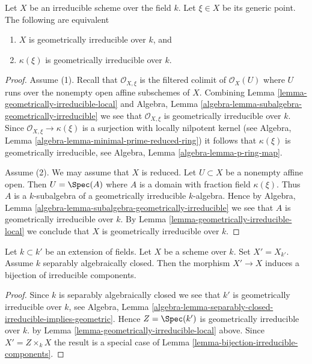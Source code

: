\begin{lemma}
\label{lemma-geometrically-irreducible-function-field}
Let $X$ be an irreducible scheme over the field $k$. Let $\xi \in X$
be its generic point. The following are equivalent
\begin{enumerate}
\item $X$ is geometrically irreducible over $k$, and
\item $\kappa(\xi)$ is geometrically irreducible over $k$.
\end{enumerate}
\end{lemma}

\begin{proof}
Assume (1). Recall that $\mathcal{O}_{X, \xi}$ is the filtered
colimit of $\mathcal{O}_X(U)$ where $U$ runs over the nonempty
open affine subschemes of $X$. Combining
Lemma \ref{lemma-geometrically-irreducible-local}
and
Algebra, Lemma \ref{algebra-lemma-subalgebra-geometrically-irreducible}
we see that $\mathcal{O}_{X, \xi}$ is geometrically irreducible over $k$.
Since $\mathcal{O}_{X, \xi} \to \kappa(\xi)$ is a surjection with
locally nilpotent kernel (see
Algebra, Lemma \ref{algebra-lemma-minimal-prime-reduced-ring})
it follows that $\kappa(\xi)$ is geometrically irreducible, see
Algebra, Lemma \ref{algebra-lemma-p-ring-map}.

\medskip\noindent
Assume (2). We may assume that $X$ is reduced. Let $U \subset X$ be
a nonempty affine open. Then $U = \Spec(A)$ where $A$ is a domain
with fraction field $\kappa(\xi)$. Thus $A$ is a $k$-subalgebra
of a geometrically irreducible $k$-algebra. Hence by
Algebra, Lemma \ref{algebra-lemma-subalgebra-geometrically-irreducible}
we see that $A$ is geometrically irreducible over $k$.
By Lemma \ref{lemma-geometrically-irreducible-local} we conclude
that $X$ is geometrically irreducible over $k$.
\end{proof}

\begin{lemma}
\label{lemma-separably-closed-field-irreducible-components}
Let $k \subset k'$ be an extension of fields.
Let $X$ be a scheme over $k$. Set $X' = X_{k'}$.
Assume $k$ separably algebraically closed.
Then the morphism $X' \to X$ induces a bijection of irreducible components.
\end{lemma}

\begin{proof}
Since $k$ is separably algebraically closed we see that
$k'$ is geometrically irreducible over $k$, see Algebra,
Lemma \ref{algebra-lemma-separably-closed-irreducible-implies-geometric}.
Hence $Z = \Spec(k')$ is geometrically irreducible over $k$.
by Lemma \ref{lemma-geometrically-irreducible-local} above.
Since $X' = Z \times_k X$ the result is a special case
of Lemma \ref{lemma-bijection-irreducible-components}.
\end{proof}

